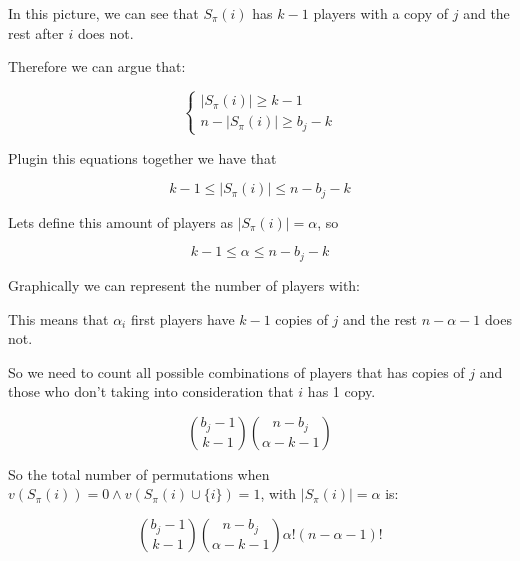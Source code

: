 \documentclass[12pt, a4paper]{article}
\begin{document}
In this picture, we can see that $S_{\pi}(i)$ has $k-1$ players with a copy of $j$ and the rest after $i$ does not.

Therefore we can argue that:

\[
  \begin{cases}
    | S_{\pi}(i) | \geq k-1 \\
    n - | S_{\pi}(i) | \geq b_j - k
  \end{cases}
\]

Plugin this equations together we have that 

\begin{equation}
  k-1 \leq | S_{\pi}(i) | \leq n - b_j - k
\end{equation}

Lets define this amount of players as $| S_{\pi}(i) | = \alpha$, so 

\begin{equation}
  k-1 \leq \alpha \leq n - b_j - k
\end{equation}

Graphically we can represent the number of players with:

\begin{center}
\end{center}

This means that $\alpha_i$ first players have $k-1$ copies of $j$ and the rest $n-\alpha-1$ does not.

So we need to count all possible combinations of players that has copies of $j$ and those who don't taking into consideration that $i$ has 1 copy.

\begin{equation}
  \binom{b_j - 1}{k-1}\binom{n-b_j}{\alpha - k - 1}
\end{equation}

So the total number of permutations when $v(S_{\pi}(i)) = 0 \land v(S_{\pi}(i) \cup \{i\}) = 1$, with $| S_{\pi}(i) | = \alpha$ is:

\begin{equation}
  \binom{b_j - 1}{k-1}\binom{n-b_j}{\alpha - k - 1} \alpha! (n - \alpha - 1)! 
\end{equation}
\end{document}
